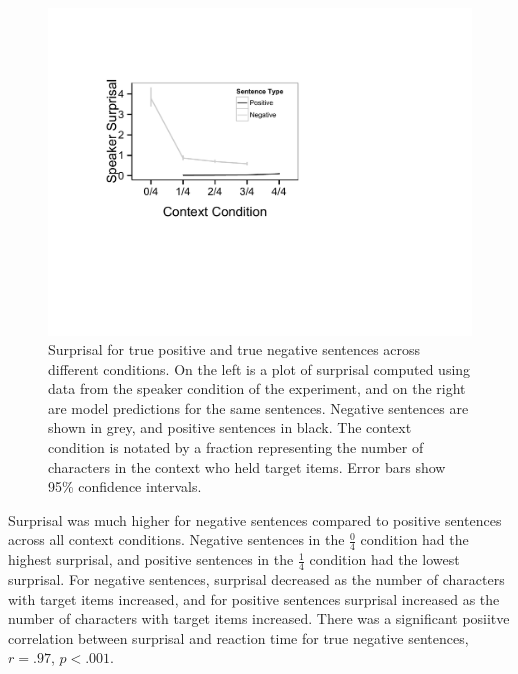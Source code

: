 \documentclass[man]{apa2}
\begin{document}
\begin{figure}[t]
\begin{center} 
\includegraphics[width=6in]{figures/surprisals.pdf}
\caption{\label{fig:e2line} Surprisal for true positive and true negative sentences across different conditions. On the left is a plot of surprisal computed using data from the speaker condition of the experiment, and on the right are model predictions for the same sentences.  Negative sentences are shown in grey, and positive sentences in black.  The context condition is notated by a fraction representing the number of characters in the context who held target items. Error bars show 95\% confidence intervals.  }
\end{center} 
\end{figure}

Surprisal was much higher for negative sentences compared to positive sentences across all context conditions.  Negative sentences in the $\frac{0}{4}$ condition had the highest surprisal, and positive sentences in the $\frac{1}{4}$ condition had the lowest surprisal.  For negative sentences, surprisal decreased as the number of characters with target items increased, and for positive sentences surprisal increased as the number of characters with target items increased.  There was a significant posiitve correlation between surprisal and reaction time for true negative sentences, $r=.97$, $p<.001$. 

\end{document}
